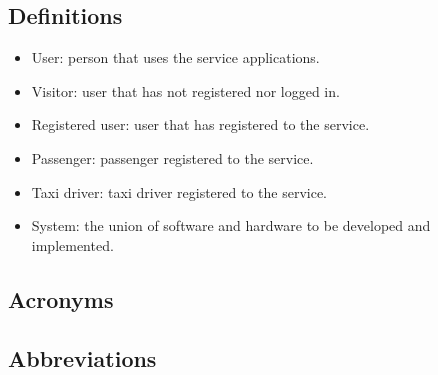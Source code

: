 \subsection{Definitions}
\begin{itemize}
	\item User: person that uses the service applications.
	\item Visitor: user that has not registered nor logged in.
	\item Registered user: user that has registered to the service.
	\item Passenger: passenger registered to the service.
	\item Taxi driver: taxi driver registered to the service.
	\item System: the union of software and hardware to be developed and implemented.
	
	
\end{itemize}
\subsection{Acronyms}
\subsection{Abbreviations}